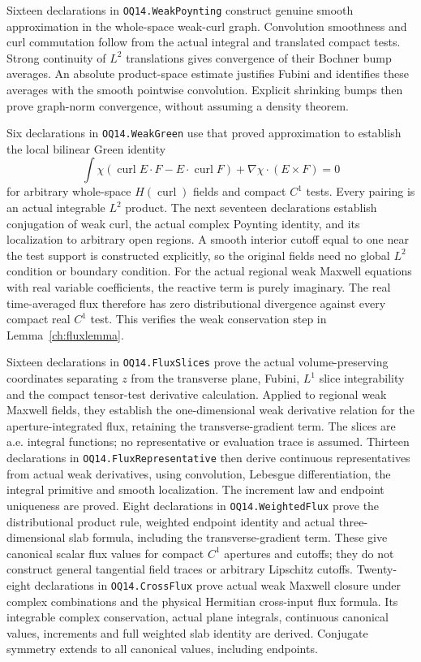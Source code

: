 Sixteen declarations in \texttt{OQ14.WeakPoynting} construct genuine
smooth approximation in the whole-space weak-curl graph. Convolution
smoothness and curl commutation follow from the actual integral and
translated compact tests. Strong continuity of $L^2$ translations gives
convergence of their Bochner bump averages. An absolute product-space
estimate justifies Fubini and identifies these averages with the smooth
pointwise convolution. Explicit shrinking bumps then prove graph-norm
convergence, without assuming a density theorem.

Six declarations in \texttt{OQ14.WeakGreen} use that proved approximation
to establish the local bilinear Green identity
\[
 \int \chi(\operatorname{curl}E\cdot F-E\cdot\operatorname{curl}F)
       +\nabla\chi\cdot(E\times F)=0
\]
for arbitrary whole-space $H(\operatorname{curl})$ fields and compact
$C^1$ tests. Every pairing is an actual integrable $L^2$ product.
The next seventeen declarations establish conjugation of weak curl,
the actual complex Poynting identity, and its localization to arbitrary
open regions. A smooth interior cutoff equal to one near the test support
is constructed explicitly, so the original fields need no global
$L^2$ condition or boundary condition. For the actual regional weak
Maxwell equations with real variable coefficients, the reactive term
is purely imaginary. The real time-averaged flux therefore has zero
distributional divergence against every compact real $C^1$ test.
This verifies the weak conservation step in Lemma~\ref{ch:fluxlemma}.

Sixteen declarations in \texttt{OQ14.FluxSlices} prove the actual
volume-preserving coordinates separating $z$ from the transverse plane,
Fubini, $L^1$ slice integrability and the compact tensor-test derivative
calculation. Applied to regional weak Maxwell fields, they establish
the one-dimensional weak derivative relation for the aperture-integrated
flux, retaining the transverse-gradient term. The slices are a.e.
integral functions; no representative or evaluation trace is assumed.
Thirteen declarations in \texttt{OQ14.FluxRepresentative} then derive
continuous representatives from actual weak derivatives, using convolution,
Lebesgue differentiation, the integral primitive and smooth localization.
The increment law and endpoint uniqueness are proved. Eight declarations
in \texttt{OQ14.WeightedFlux} prove the distributional product rule,
weighted endpoint identity and actual three-dimensional slab formula,
including the transverse-gradient term. These give canonical scalar flux
values for compact $C^1$ apertures and cutoffs; they do not construct
general tangential field traces or arbitrary Lipschitz cutoffs.
Twenty-eight declarations in \texttt{OQ14.CrossFlux} prove actual weak
Maxwell closure under complex combinations and the physical Hermitian
cross-input flux formula. Its integrable complex conservation, actual
plane integrals, continuous canonical values, increments and full
weighted slab identity are derived. Conjugate symmetry extends to all
canonical values, including endpoints.

